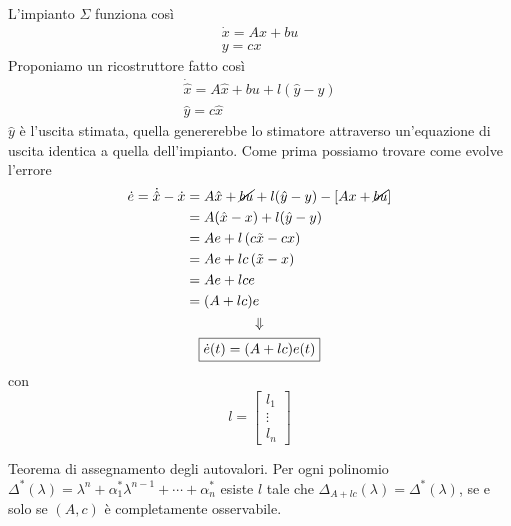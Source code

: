 \documentclass[10pt,a4paper]{book}
\begin{document}
\begin{figure}[htpb]
\end{figure}\FloatBarrier

L'impianto $\Sigma $ funziona così
\begin{gather*}
\dot{x} =Ax+bu\\
y=cx
\end{gather*}
Proponiamo un ricostruttore fatto così
\begin{gather*}
\boxed{\dot{\hat{x}} =A\hat{x} +bu+l(\hat{y} -y)}\\
\hat{y} =c\hat{x}
\end{gather*}
$\hat{y}$ è l'uscita stimata, quella genererebbe lo stimatore attraverso un'equazione di uscita identica a quella dell'impianto. Come prima possiamo trovare come evolve l'errore
\begin{gather*}
\begin{aligned}
\dot{e} =\dot{\hat{x}} -\dot{x} & =A\hat{x} +\cancel{bu} +l(\hat{y} -y) -\left[ Ax+\cancel{bu}\right]\\
 & =A(\hat{x} -x) +l(\hat{y} -y)\\
 & =Ae+l\left( c\tilde{x} -cx\right)\\
 & =Ae+lc\left(\tilde{x} -x\right)\\
 & =Ae+lce\\
 & =( A+lc) e
\end{aligned}\\
\Downarrow \\
\boxed{\dot{e}(t) =( A+lc) e(t)}
\end{gather*}
con
\begin{equation*}
l=\begin{bmatrix}
l_1\\
\vdots \\
l_n
\end{bmatrix}
\end{equation*}
\begin{theorem}
Teorema di assegnamento degli autovalori. Per ogni polinomio $\Delta ^{*}( \lambda ) =\lambda ^{n} +\alpha ^{*}_1 \lambda ^{n-1} +\cdots +\alpha ^{*}_n$ esiste $l$ tale che $\Delta _{A+lc}( \lambda ) =\Delta ^{*}( \lambda )$, se e solo se $( A,c)$ è completamente osservabile.
\end{theorem}
\end{document}

